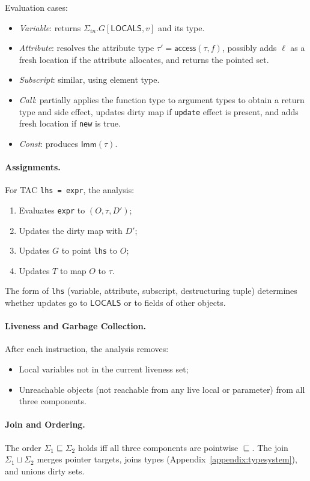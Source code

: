 Evaluation cases:
\begin{itemize}
\item \emph{Variable}: returns $\Sigma_{\mathit{in}}.G[\mathsf{LOCALS}, v]$ and its type.
\item \emph{Attribute}: resolves the attribute type $\tau' = \mathsf{access}(\tau, f)$, possibly adds $\ell$ as a fresh location if the attribute allocates, and returns the pointed set.
\item \emph{Subscript}: similar, using element type.
\item \emph{Call}: partially applies the function type to argument types to obtain a return type and side effect, updates dirty map if \texttt{update} effect is present, and adds fresh location if \texttt{new} is true.
\item \emph{Const}: produces $\mathsf{Imm}(\tau)$.
\end{itemize}

\paragraph{Assignments.}
For TAC \texttt{lhs = expr}, the analysis:
\begin{enumerate}
\item Evaluates \texttt{expr} to $(O, \tau, D')$;
\item Updates the dirty map with $D'$;
\item Updates $G$ to point \texttt{lhs} to $O$;
\item Updates $T$ to map $O$ to $\tau$.
\end{enumerate}

The form of \texttt{lhs} (variable, attribute, subscript, destructuring tuple) determines whether updates go to $\mathsf{LOCALS}$ or to fields of other objects.

\paragraph{Liveness and Garbage Collection.}
After each instruction, the analysis removes:
\begin{itemize}
\item Local variables not in the current liveness set;
\item Unreachable objects (not reachable from any live local or parameter) from all three components.
\end{itemize}

\paragraph{Join and Ordering.}
The order $\Sigma_1 \sqsubseteq \Sigma_2$ holds iff all three components are pointwise $\sqsubseteq$.  
The join $\Sigma_1 \sqcup \Sigma_2$ merges pointer targets, joins types (Appendix~\ref{appendix:typesystem}), and unions dirty sets.

